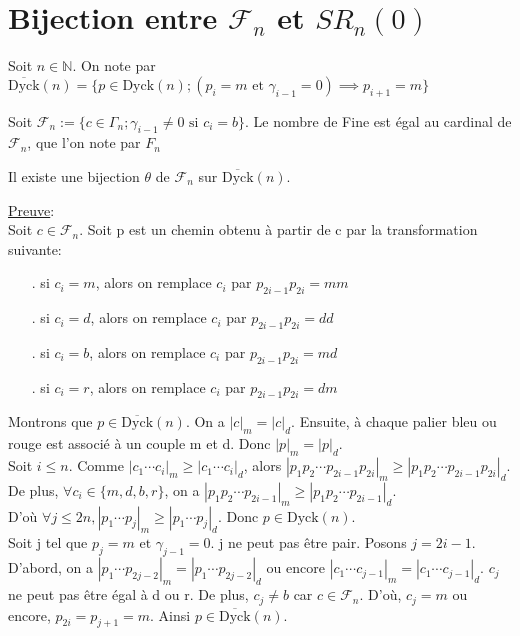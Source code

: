 	\section{Bijection entre $\mathcal{F}_{n}$ et $SR_{n}(0)$}
		Soit $n\in \mathbb{N}$. On note par
		$\overline{\text{Dyck}}(n) = \{ p \in \text{Dyck}(n);(p_{i}=m \text{ et } \gamma_{i-1}=0)\implies p_{i+1}=m\} $
		\begin{definition}
			\begin{rm}
				Soit $\mathcal{F}_{n} := \{ c \in \Gamma_{n}; \gamma_{i-1}\neq 0 \text{ si } c_{i}=b \}$.
				Le nombre de Fine est égal au cardinal de $\mathcal{F}_{n}$,  que l'on note par $F_{n}$
			\end{rm}
		\end{definition}

		\begin{proposition}
			Il existe une bijection $\theta$ de $\mathcal{F}_{n}$ sur $\overline{\text{Dyck}}(n)$. 
		\end{proposition}
		\underline{Preuve}:\\
			Soit $c\in \mathcal{F}_{n}$. Soit p est un chemin obtenu à partir de c par la transformation suivante: 
			\begin{itemize}
				\item[.] si $c_{i}=m $, alors on remplace $c_{i}$ par $p_{2i-1}p_{2i}=mm$
				\item[.] si $c_{i}=d $, alors on remplace $c_{i}$ par $p_{2i-1}p_{2i}=dd$
				\item[.] si $c_{i}=b $, alors on remplace $c_{i}$ par $p_{2i-1}p_{2i}=md$
				\item[.] si $c_{i}=r $, alors on remplace $c_{i}$ par $p_{2i-1}p_{2i}=dm$
			\end{itemize}
			Montrons que $p\in \overline{\text{Dyck}}(n) $. On a $|c|_{m}=|c|_{d}$. Ensuite, à chaque palier bleu ou rouge est associé à un couple m et d. Donc $|p|_{m}=|p|_{d}$.\\
			Soit $i \leq n$. Comme $|c_{1}\cdots c_{i}|_{m}\geq |c_{1}\cdots c_{i}|_{d}$, alors $|p_{1}p_{2} \cdots p_{2i-1}p_{2i}|_{m}\geq |p_{1}p_{2} \cdots p_{2i-1}p_{2i}|_{d}$.\\De plus, $\forall c_{i} \in \{ m,d,b,r \}$, on a $|p_{1}p_{2} \cdots p_{2i-1}|_{m}\geq |p_{1}p_{2} \cdots p_{2i-1}|_{d}$.\\ D'où $\forall j\leq 2n, |p_{1} \cdots p_{j}|_{m}\geq |p_{1} \cdots p_{j}|_{d}$. Donc $p\in \text{Dyck}(n) $.\\
			Soit j tel que $p_{j}=m \text{ et } \gamma_{j-1}=0$. j ne peut pas être pair. Posons $j=2i-1$. D'abord, on a $|p_{1} \cdots p_{2j-2}|_{m} = |p_{1} \cdots p_{2j-2}|_{d}$ ou encore $|c_{1} \cdots c_{j-1}|_{m} = |c_{1} \cdots c_{j-1}|_{d}$. $c_{j}$ ne peut pas être égal à d ou r. De plus, $c_{j}\neq b$ car $c\in \mathcal{F}_{n}$. D'où, $c_{j}=m$ ou encore, $p_{2i}=p_{j+1}=m$. Ainsi $p\in \overline{\text{Dyck}}(n) $.\\

